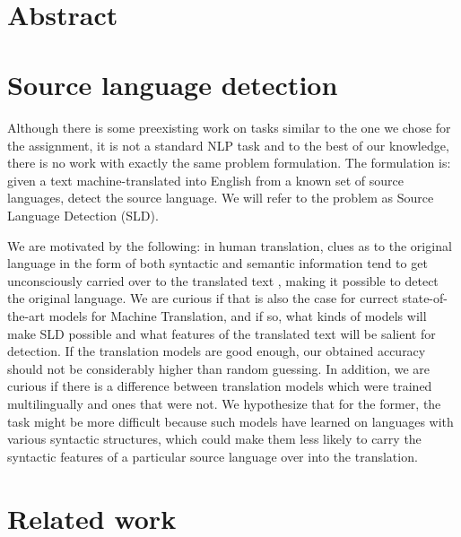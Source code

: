 \documentclass[twocolumn]{article}
\title{{\Huge \textbf{}} \\ }
\author{ \\ {\small }}
\date{}
\begin{document}
\section*{Abstract}

\section*{Source language detection}

Although there is some preexisting work on tasks similar to the one we chose for the assignment, it is not a standard NLP task and to the best of our knowledge, there is no work with exactly the same problem formulation. The formulation is: given a text machine-translated into English from a known set of source languages, detect the source language. We will refer to the problem as Source Language Detection (SLD).

We are motivated by the following: in human translation, clues as to the original language in the form of both syntactic and semantic information tend to get unconsciously carried over to the translated text \cite{literary}, making it possible to detect the original language. We are curious if that is also the case for currect state-of-the-art models for Machine Translation, and if so, what kinds of models will make SLD possible and what features of the translated text will be salient for detection. If the translation models are good enough, our obtained accuracy should not be considerably higher than random guessing. In addition, we are curious if there is a difference between translation models which were trained multilingually and ones that were not. We hypothesize that for the former, the task might be more difficult because such models have learned on languages with various syntactic structures, which could make them less likely to carry the syntactic features of a particular source language over into the translation.


\section*{Related work}
\end{document}

